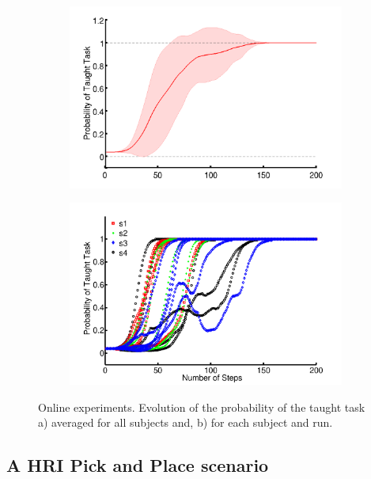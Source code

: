 \documentclass[conference]{IEEEtran}
\begin{document}
\begin{figure}[!h]
	\centering
		\begin{subfigure}[t]{0.49\columnwidth}
			\centering
   			\includegraphics[width=\columnwidth]{images/Avg_evo_likelihood}
   			\caption{} 
			\label{fig:avg_evo_real}
		\end{subfigure}
		\begin{subfigure}[t]{0.49\columnwidth}
			\centering
   			\includegraphics[width=\columnwidth]{images/Evo_likelihood}
   			\caption{} 
			\label{fig:subject_evo_real}
		\end{subfigure}
		
	\caption{\label{fig:online_results} Online experiments. Evolution of the probability of the taught task a) averaged for all subjects and, b) for each subject and run.} 
\end{figure}


\subsection{A HRI Pick and Place scenario}
\end{document}
